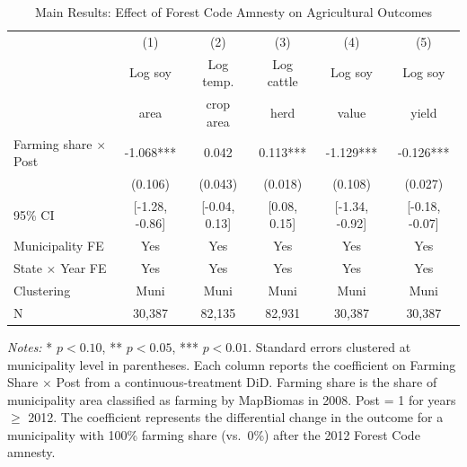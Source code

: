\begin{table}[H]
\centering
\caption{Main Results: Effect of Forest Code Amnesty on Agricultural Outcomes}
\begin{threeparttable}
\small
\begin{tabular}{lccccc}
\toprule
 & (1) & (2) & (3) & (4) & (5) \\
 & Log soy & Log temp. & Log cattle & Log soy & Log soy \\
 & area & crop area & herd & value & yield \\
\midrule
Farming share $\times$ Post & -1.068*** & 0.042 & 0.113*** & -1.129*** & -0.126*** \\
 & (0.106) & (0.043) & (0.018) & (0.108) & (0.027) \\
95\% CI & [-1.28, -0.86] & [-0.04, 0.13] & [0.08, 0.15] & [-1.34, -0.92] & [-0.18, -0.07] \\
\midrule
Municipality FE & Yes & Yes & Yes & Yes & Yes \\
State $\times$ Year FE & Yes & Yes & Yes & Yes & Yes \\
Clustering & Muni & Muni & Muni & Muni & Muni \\
N & 30,387 & 82,135 & 82,931 & 30,387 & 30,387 \\
\bottomrule
\end{tabular}
\begin{tablenotes}[flushleft]
\small
\item \textit{Notes:} * $p<0.10$, ** $p<0.05$, *** $p<0.01$. Standard errors clustered at municipality level in parentheses. Each column reports the coefficient on Farming Share $\times$ Post from a continuous-treatment DiD. Farming share is the share of municipality area classified as farming by MapBiomas in 2008. Post = 1 for years $\geq$ 2012. The coefficient represents the differential change in the outcome for a municipality with 100\% farming share (vs.~0\%) after the 2012 Forest Code amnesty.
\end{tablenotes}
\end{threeparttable}
\label{tab:main}
\end{table}
